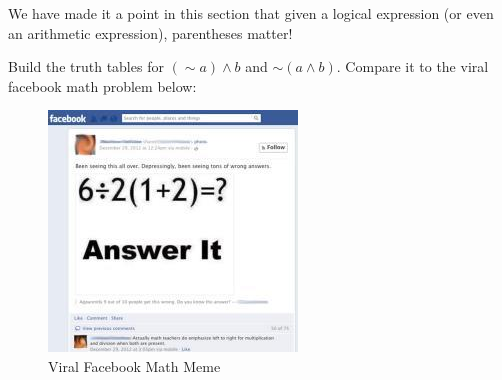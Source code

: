 We have made it a point in this section that given a logical expression (or even an arithmetic expression), parentheses matter!

Build the truth tables for $(\sim a) \land b$ and $\sim (a \land b)$. Compare it to the viral facebook math problem below:

\begin{figure}[ht]
    \centering
    \includegraphics{Ch1/arithmetic.jpg}
    \caption{Viral Facebook Math Meme}
    \label{fig:arithmetic}
\end{figure}